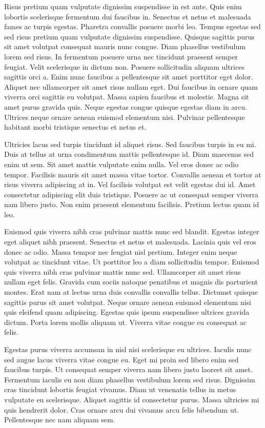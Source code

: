 \documentclass[11pt,a4paper]{article}
\begin{document}
Risus pretium quam vulputate dignissim suspendisse in est ante. Quis enim lobortis scelerisque fermentum dui faucibus in. Senectus et netus et malesuada fames ac turpis egestas. Pharetra convallis posuere morbi leo. Tempus egestas sed sed risus pretium quam vulputate dignissim suspendisse. Quisque sagittis purus sit amet volutpat consequat mauris nunc congue. Diam phasellus vestibulum lorem sed risus. In fermentum posuere urna nec tincidunt praesent semper feugiat. Velit scelerisque in dictum non. Posuere sollicitudin aliquam ultrices sagittis orci a. Enim nunc faucibus a pellentesque sit amet porttitor eget dolor. Aliquet nec ullamcorper sit amet risus nullam eget. Dui faucibus in ornare quam viverra orci sagittis eu volutpat. Massa sapien faucibus et molestie. Magna sit amet purus gravida quis. Neque egestas congue quisque egestas diam in arcu. Ultrices neque ornare aenean euismod elementum nisi. Pulvinar pellentesque habitant morbi tristique senectus et netus et.

Ultricies lacus sed turpis tincidunt id aliquet risus. Sed faucibus turpis in eu mi. Duis at tellus at urna condimentum mattis pellentesque id. Diam maecenas sed enim ut sem. Sit amet mattis vulputate enim nulla. Vel eros donec ac odio tempor. Facilisis mauris sit amet massa vitae tortor. Convallis aenean et tortor at risus viverra adipiscing at in. Vel facilisis volutpat est velit egestas dui id. Amet consectetur adipiscing elit duis tristique. Posuere ac ut consequat semper viverra nam libero justo. Non enim praesent elementum facilisis. Pretium lectus quam id leo.

Euismod quis viverra nibh cras pulvinar mattis nunc sed blandit. Egestas integer eget aliquet nibh praesent. Senectus et netus et malesuada. Lacinia quis vel eros donec ac odio. Massa tempor nec feugiat nisl pretium. Integer enim neque volutpat ac tincidunt vitae. Ut porttitor leo a diam sollicitudin tempor. Euismod quis viverra nibh cras pulvinar mattis nunc sed. Ullamcorper sit amet risus nullam eget felis. Gravida cum sociis natoque penatibus et magnis dis parturient montes. Erat nam at lectus urna duis convallis convallis tellus. Dictumst quisque sagittis purus sit amet volutpat. Neque ornare aenean euismod elementum nisi quis eleifend quam adipiscing. Egestas quis ipsum suspendisse ultrices gravida dictum. Porta lorem mollis aliquam ut. Viverra vitae congue eu consequat ac felis.

Egestas purus viverra accumsan in nisl nisi scelerisque eu ultrices. Iaculis nunc sed augue lacus viverra vitae congue eu. Eget mi proin sed libero enim sed faucibus turpis. Ut consequat semper viverra nam libero justo laoreet sit amet. Fermentum iaculis eu non diam phasellus vestibulum lorem sed risus. Dignissim cras tincidunt lobortis feugiat vivamus. Diam ut venenatis tellus in metus vulputate eu scelerisque. Aliquet sagittis id consectetur purus. Massa ultricies mi quis hendrerit dolor. Cras ornare arcu dui vivamus arcu felis bibendum ut. Pellentesque nec nam aliquam sem.
\end{document}
